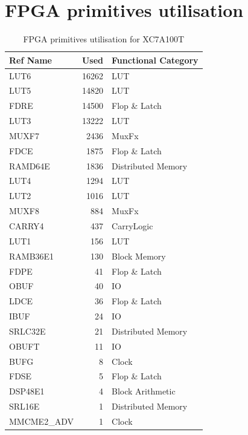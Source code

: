 \section{FPGA primitives utilisation}
\label{app:res_usage}
\begin{table}
    \centering
    \caption{FPGA primitives utilisation for XC7A100T}
    \begin{tabular}{|l|r|l|}
        \toprule
        Ref Name   & Used & Functional Category \\
        \midrule
        LUT6       & 16262 & LUT \\
        LUT5       & 14820 & LUT \\
        FDRE       & 14500 & Flop \& Latch \\
        LUT3       & 13222 & LUT \\
        MUXF7      &  2436 & MuxFx \\
        FDCE       &  1875 & Flop \& Latch \\
        RAMD64E    &  1836 & Distributed Memory \\
        LUT4       &  1294 & LUT \\
        LUT2       &  1016 & LUT \\
        MUXF8      &   884 & MuxFx \\
        CARRY4     &   437 & CarryLogic \\
        LUT1       &   156 & LUT \\
        RAMB36E1   &   130 & Block Memory \\
        FDPE       &    41 & Flop \& Latch \\
        OBUF       &    40 & IO \\
        LDCE       &    36 & Flop \& Latch \\
        IBUF       &    24 & IO \\
        SRLC32E    &    21 & Distributed Memory \\
        OBUFT      &    11 & IO \\
        BUFG       &     8 & Clock \\
        FDSE       &     5 & Flop \& Latch \\
        DSP48E1    &     4 & Block Arithmetic \\
        SRL16E     &     1 & Distributed Memory \\
        MMCME2\_ADV &    1 & Clock \\
        \bottomrule
    \end{tabular}
\end{table}


